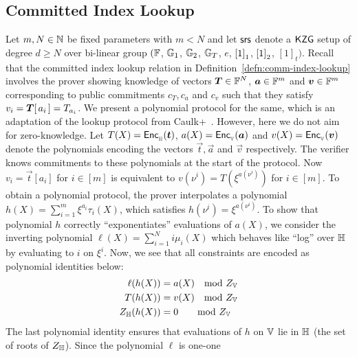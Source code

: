 \subsection{Committed Index Lookup}\label{subsec:committed-index-lookup}
Let $m,N\in \mathbb{N}$ be fixed parameters with $m < N$ and let $\mathsf{srs}$ denote a $\mathsf{KZG}$ setup of degree $d\geq N$
over bi-linear group $(\mathbb{F}$, $\mathbb{G}_1$, $\mathbb{G}_2$, $\mathbb{G}_T$, $e$, $\left[{1}\right]_1$, $\left[{1}\right]_2$, $[1]_t)$. Recall that the committed index
lookup relation in Definition~\ref{defn:comm-index-lookup} involves the prover showing knowledge of vectors $\vecT\in \F^N$,
$\vec{a}\in \F^m$ and $\vec{v}\in \F^m$ corresponding to public commitments $c_T, c_a$ and $c_v$ such that they
satisfy $v_i = \vecT[\,a_i\,] = T_{a_i}$.
We present a polynomial protocol for the same, which is an adaptation of the lookup protocol from Caulk+~\cite{EPRINT:PosKat22}.
However, here we do not aim for zero-knowledge. Let $T(X)=\enc{t}{\setN}$, $a(X)=\enc{a}{\setV}$ and
$v(X)=\enc{v}{\setV}$ denote the polynomials encoding the vectors $\vec{t},\vec{a}$ and $\vec{v}$ respectively.
The verifier knows commitments to these polynomials at the start of the protocol.
Now $v_i = \vec{t}[a_i]$ for $i\in [m]$ is equivalent to $v(\nu^i) = T(\xi^{a(\nu^i)})$ for $i\in [m]$. To
obtain a polynomial protocol, the prover interpolates a polynomial $h(X)=\sum_{i=1}^m \xi^{a_i}\tau_i(X)$, which satisfies
$h(\nu^i)=\xi^{a(\nu^i)}$. To show that polynomial $h$ correctly ``exponentiates'' evaluations of $a(X)$, we consider the
inverting polynomial $\ell(X)=\sum_{i=1}^N i\mu_i(X)$ which behaves like ``log'' over $\mathbb{H}$ by evaluating to $i$ on $\xi^i$. Now, we see
that all constraints are encoded as polynomial identities below:
\begin{equation}
    \begin{aligned}
        \ell(h(X)) &= a(X) \quad \text{mod } Z_{\setV}\\  %
        T(h(X)) &= v(X) \quad \text{mod } Z_\setV \\ %
        Z_{\setN}(h(X)) &= 0 \qquad \text{mod } Z_\setV  %
    \end{aligned}
    \label{eq:comm-index-lookup}
\end{equation}
The last polynomial identity ensures that evaluations of $h$ on $\mathbb{V}$ lie in $\mathbb{H}$ (the set of roots of $Z_\mathbb{H}$). Since the polynomial $\ell$ is one-one
